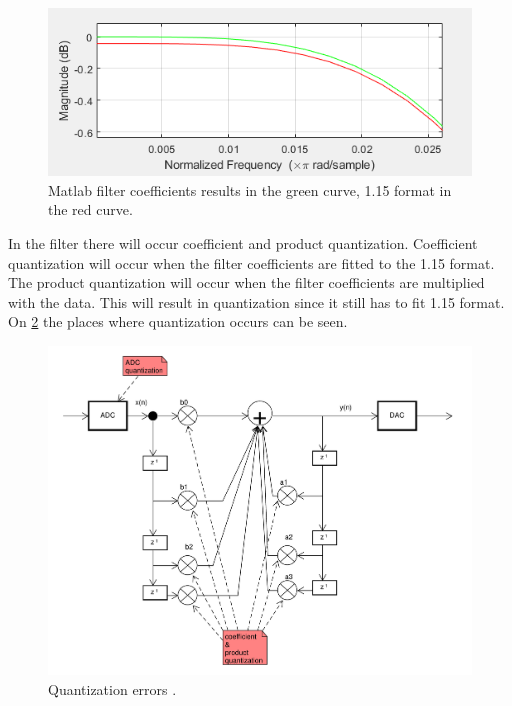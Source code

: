 \begin{figure}
	\centering
	\includegraphics[width=1\linewidth]{gfx/QuantizationFilter.png}
	\caption{Matlab filter coefficients results in the green curve, 1.15 format in the red curve.}
	\label{fig:quant_error_filter}
\end{figure}


In the filter there will occur coefficient and product quantization. Coefficient quantization will occur when the filter coefficients are fitted to the 1.15 format.
The product quantization will occur when the filter coefficients are multiplied with the data.
This will result in quantization since it still has to fit 1.15 format.
On \cref{fig:quant_error} the places where quantization occurs can be seen.

\begin{figure}
	\centering
	\includegraphics[width=1\linewidth]{gfx/Design/flow_quant_error.pdf}
	\caption{Quantization errors \systemName.}
	\label{fig:quant_error}
\end{figure}

\FloatBarrier